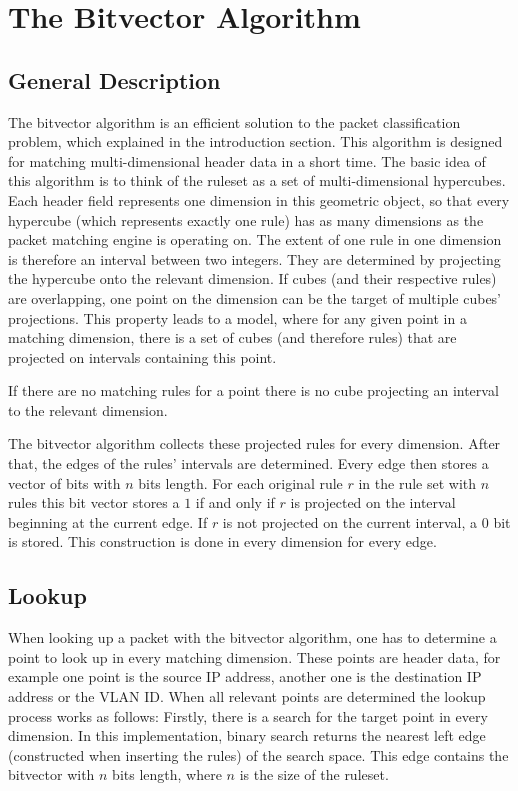 \documentclass[a4paper,
		12pt,
		parskip=full,
		titlepage
		]{scrartcl}
\begin{document}
\section{The Bitvector Algorithm}
\subsection{General Description}
The bitvector algorithm \cite{bv} is an efficient solution to the packet classification problem, which explained in the introduction section.
This algorithm is designed for matching multi-dimensional header data in a short time.
The basic idea of this algorithm is to think of the ruleset as a set of multi-dimensional hypercubes.
Each header field represents one dimension in this geometric object, so that every hypercube (which represents exactly one rule) has as many dimensions as the packet matching engine is operating on.
The extent of one rule in one dimension is therefore an interval between two integers.
They are determined by projecting the hypercube onto the relevant dimension.
If cubes (and their respective rules) are overlapping, one point on the dimension can be the target of multiple cubes' projections. 
This property leads to a model, where for any given point in a matching dimension, there is a set of cubes (and therefore rules) that are projected on intervals containing this point.

If there are no matching rules for a point there is no cube projecting an interval to the relevant dimension.

The bitvector algorithm collects these projected rules for every dimension.
After that, the edges of the rules' intervals are determined.
Every edge then stores a vector of bits with $n$ bits length.
For each original rule $r$ in the rule set with $n$ rules this bit vector stores a $1$ if and only if $r$ is projected on the interval beginning at the current edge.
If $r$ is not projected on the current interval, a $0$ bit is stored.
This construction is done in every dimension for every edge.

\subsection{Lookup}
When looking up a packet with the bitvector algorithm, one has to determine a point to look up in every matching dimension.
These points are header data, for example one point is the source IP address, another one is the destination IP address or the VLAN ID.
When all relevant points are determined the lookup process works as follows:
Firstly, there is a search for the target point in every dimension.
In this implementation, binary search returns the nearest left edge (constructed when inserting the rules) of the search space.
This edge contains the bitvector with $n$ bits length, where $n$ is the size of the ruleset.
\end{document}
